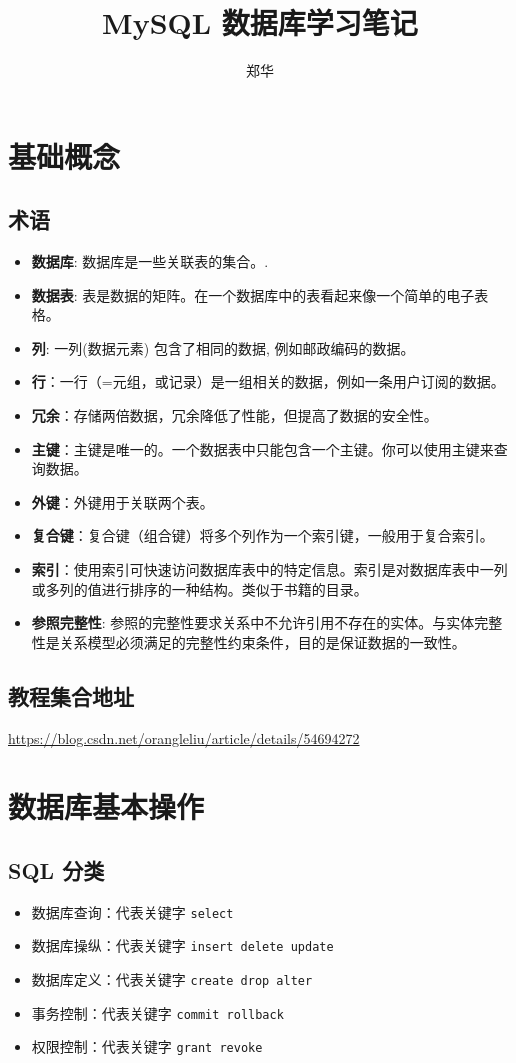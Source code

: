 \documentclass[UTF8,a4paper,12pt]{ctexbook}
\author{\kaishu 郑华}
\title{\heiti MySQL 数据库学习笔记}
\begin{document}
 	\maketitle
 \chapter{基础概念}
	 \section{术语}
		 \begin{itemize}
		 	\item  \textbf{数据库}: 数据库是一些关联表的集合。.
		 	\item  \textbf{数据表}: 表是数据的矩阵。在一个数据库中的表看起来像一个简单的电子表格。
		 	\item  \textbf{列}: 一列(数据元素) 包含了相同的数据, 例如邮政编码的数据。
		 	\item  \textbf{行}：一行（=元组，或记录）是一组相关的数据，例如一条用户订阅的数据。
		 	\item  \textbf{冗余}：存储两倍数据，冗余降低了性能，但提高了数据的安全性。
		 	\item  \textbf{主键}：主键是唯一的。一个数据表中只能包含一个主键。你可以使用主键来查询数据。
		 	\item  \textbf{外键}：外键用于关联两个表。
		 	\item  \textbf{复合键}：复合键（组合键）将多个列作为一个索引键，一般用于复合索引。
		 	\item  \textbf{索引}：使用索引可快速访问数据库表中的特定信息。索引是对数据库表中一列或多列的值进行排序的一种结构。类似于书籍的目录。
		 	\item  \textbf{参照完整性}: 参照的完整性要求关系中不允许引用不存在的实体。与实体完整性是关系模型必须满足的完整性约束条件，目的是保证数据的一致性。
		 \end{itemize}
		
	 
	 \section{教程集合地址}
	 	\url{https://blog.csdn.net/orangleliu/article/details/54694272}
	 	
\chapter{数据库基本操作}
	\section{SQL 分类}
		\begin{itemize}
			\item 数据库查询：代表关键字 \verb|select|
			\item 数据库操纵：代表关键字 \verb|insert delete update|
			\item 数据库定义：代表关键字 \verb|create drop alter|
			\item 事务控制：代表关键字 \verb|commit rollback|
			\item 权限控制：代表关键字 \verb|grant revoke|
		\end{itemize} 
	
\end{document}
